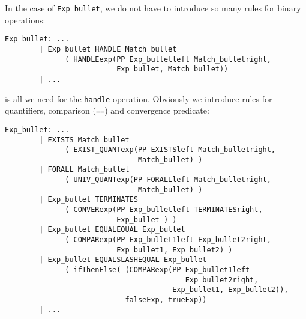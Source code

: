 In the case of {\tt Exp\_bullet}, we do not have to introduce so many
rules for binary operations:
{\small
\begin{verbatim}
Exp_bullet: ...
        | Exp_bullet HANDLE Match_bullet
              ( HANDLEexp(PP Exp_bulletleft Match_bulletright, 
                          Exp_bullet, Match_bullet))
        | ...
\end{verbatim}}
  \noindent is all we need for the {\tt handle} operation. Obviously we introduce
  rules for quantifiers, comparison ({\tt ==}) and convergence
  predicate: {\small
\begin{verbatim}
Exp_bullet: ...
        | EXISTS Match_bullet 
              ( EXIST_QUANTexp(PP EXISTSleft Match_bulletright, 
                               Match_bullet) )
        | FORALL Match_bullet 
              ( UNIV_QUANTexp(PP FORALLleft Match_bulletright, 
                               Match_bullet) )
        | Exp_bullet TERMINATES 
              ( CONVERexp(PP Exp_bulletleft TERMINATESright, 
                          Exp_bullet ) )
        | Exp_bullet EQUALEQUAL Exp_bullet
              ( COMPARexp(PP Exp_bullet1left Exp_bullet2right, 
                          Exp_bullet1, Exp_bullet2) )
        | Exp_bullet EQUALSLASHEQUAL Exp_bullet
              ( ifThenElse( (COMPARexp(PP Exp_bullet1left
                                          Exp_bullet2right, 
                                       Exp_bullet1, Exp_bullet2)),
                            falseExp, trueExp))
        | ...
\end{verbatim}}

